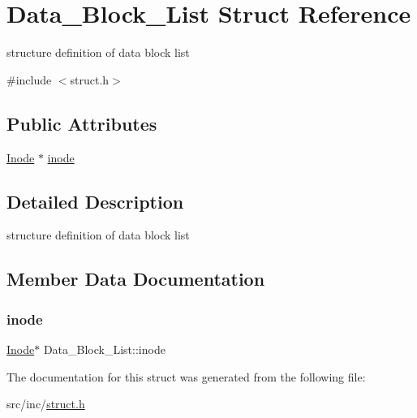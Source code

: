 \hypertarget{struct_data___block___list}{}\section{Data\+\_\+\+Block\+\_\+\+List Struct Reference}
\label{struct_data___block___list}


structure definition of data block list  




{\ttfamily \#include $<$struct.\+h$>$}

\subsection*{Public Attributes}
\begin{DoxyCompactItemize}
\item 
\mbox{\hyperlink{struct_8h_a98d620fb2fb559434fab4f1283139169}{Inode}} $\ast$ \mbox{\hyperlink{struct_data___block___list_ad5189d42c91cc6403cba7d36615e81df}{inode}}
\end{DoxyCompactItemize}


\subsection{Detailed Description}
structure definition of data block list 

\subsection{Member Data Documentation}
\mbox{\label{struct_data___block___list_ad5189d42c91cc6403cba7d36615e81df}} 
\subsubsection{\texorpdfstring{inode}{inode}}
{\footnotesize\ttfamily \mbox{\hyperlink{struct_8h_a98d620fb2fb559434fab4f1283139169}{Inode}}$\ast$ Data\+\_\+\+Block\+\_\+\+List\+::inode}



The documentation for this struct was generated from the following file\+:\begin{DoxyCompactItemize}
\item 
src/inc/\mbox{\hyperlink{struct_8h}{struct.\+h}}\end{DoxyCompactItemize}
